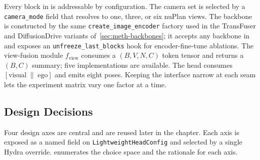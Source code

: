 Every block in  is addressable by configuration. The camera set is selected by a \texttt{camera\_mode} field that resolves to one, three, or six nuPlan views. The backbone is constructed by the same \texttt{create\_image\_encoder} factory used in the TransFuser and DiffusionDrive variants of~\ref{sec:meth-backbones}; it accepts any backbone in  and exposes an \texttt{unfreeze\_last\_blocks} hook for encoder-fine-tune ablations. The view-fusion module $f_\text{view}$ consumes a $(B, V, N, C)$ token tensor and returns a $(B, C)$ summary; five implementations are available. The head consumes $[\text{visual} \;\|\; \text{ego}]$ and emits eight poses. Keeping the interface narrow at each seam lets the experiment matrix vary one factor at a time.

\subsection{Design Decisions}
\label{sec:meth-lh-design}

Four design axes are central and are reused later in the chapter. Each axis is exposed as a named field on \texttt{LightweightHeadConfig} and selected by a single Hydra override.  enumerates the choice space and the rationale for each axis.

